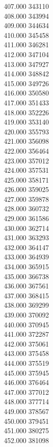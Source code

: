 { 407.000	343110 \\
 408.000	343994 \\
 409.000	344634 \\
 410.000	345458 \\
 411.000	346281 \\
 412.000	347104 \\
 413.000	347927 \\
 414.000	348842 \\
 415.000	349726 \\
 416.000	350580 \\
 417.000	351433 \\
 418.000	352226 \\
 419.000	353140 \\
 420.000	355793 \\
 421.000	356098 \\
 422.000	356464 \\
 423.000	357012 \\
 424.000	357531 \\
 425.000	358171 \\
 426.000	359025 \\
 427.000	359878 \\
 428.000	360732 \\
 429.000	361586 \\
 430.000	362714 \\
 431.000	363293 \\
 432.000	364147 \\
 433.000	364939 \\
 434.000	365915 \\
 435.000	366738 \\
 436.000	367561 \\
 437.000	368415 \\
 438.000	369299 \\
 439.000	370092 \\
 440.000	370945 \\
 441.000	372287 \\
 442.000	375061 \\
 443.000	375458 \\
 444.000	375519 \\
 445.000	375945 \\
 446.000	376464 \\
 447.000	377012 \\
 448.000	377714 \\
 449.000	378567 \\
 450.000	379451 \\
 451.000	380275 \\
 452.000	381098 \\
}
